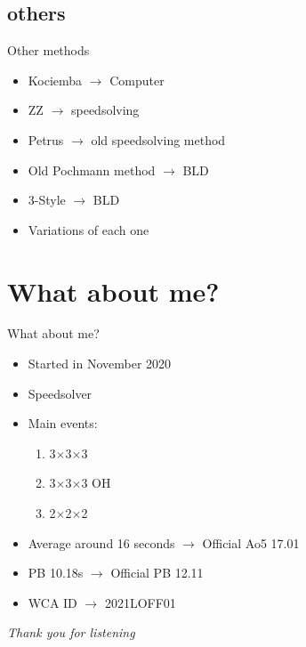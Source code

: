\documentclass[10pt]{beamer}
\begin{document}
        \subsection{others}
            \begin{frame}{Other methods}
                \begin{itemize}
                    \item Kociemba $\rightarrow{}$ Computer \pause{}
                    \item ZZ $\rightarrow{}$ speedsolving \pause{}
                    \item Petrus $\rightarrow{}$ old speedsolving method \pause{}
                    \item Old Pochmann method $\rightarrow{}$ BLD \pause{}
                    \item 3-Style $\rightarrow{}$ BLD \pause{}
                    \item Variations of each one 
                \end{itemize}
            \end{frame}
    \section{What about me?}
        \begin{frame}{What about me?}
            \begin{itemize}
                \item Started in November 2020 \pause{}
                \item Speedsolver \pause{}
                \item Main events: \pause{}
                \begin{enumerate}
                    \item 3$\times$3$\times$3 \pause{}
                    \item 3$\times$3$\times$3 OH \pause{}
                    \item 2$\times$2$\times$2 \pause{}
                \end{enumerate}
                \item Average around 16 seconds $\rightarrow$ Official Ao5 17.01 \pause{}
                \item PB 10.18s $\rightarrow$ Official PB 12.11\pause{}
                \item WCA ID $\rightarrow$ 2021LOFF01
            \end{itemize}
        \end{frame}
    \begin{frame}{}
        \centering \Large
        \emph{Thank you for listening}
        \end{frame}
\end{document}
